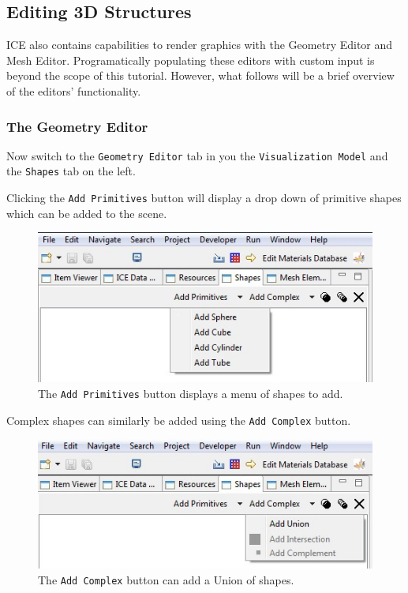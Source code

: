 \subsection{Editing 3D Structures}

ICE also contains capabilities to render graphics with the Geometry Editor and
Mesh Editor. Programatically populating these editors with custom input is
beyond the scope of this tutorial. However, what follows will be a brief
overview of the editors' functionality.

\subsubsection{The Geometry Editor}

Now switch to the \texttt{Geometry Editor} tab in you the \texttt{Visualization
Model} and the \texttt{Shapes} tab on the left.

Clicking the \texttt{Add Primitives} button will display a drop down of
primitive shapes which can be added to the scene.

\begin{figure}[!h]
\includegraphics[width=12cm]{images/AddPrimitiveShape}
\centering
\caption{The \texttt{Add Primitives} button displays a menu of shapes to add.}
\label{fig:addprimitiveshape}
\end{figure}

Complex shapes can similarly be added using the \texttt{Add Complex} button.

\begin{figure}[!h]
\includegraphics[width=12cm]{images/AddComplexShape}
\centering
\caption{The \texttt{Add Complex} button can add a Union of shapes.}
\label{fig:addcomplexshape}
\end{figure}

